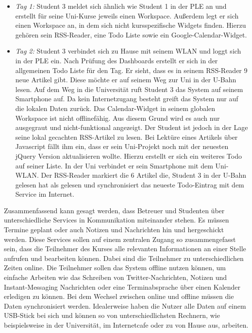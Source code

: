 \begin{itemize}
 \item \emph{Tag 1:} Student 3 meldet sich ähnlich wie Student 1 in der PLE an und erstellt für seine Uni-Kurse jeweils einen Workspace. Außerdem legt er sich einen Workspace an, in dem sich nicht kursspezifische Widgets finden. Hierzu gehören sein RSS-Reader, eine Todo Liste sowie ein Google-Calendar-Widget.
 \item \emph{Tag 2:} Student 3 verbindet sich zu Hause mit seinem WLAN und loggt sich in der PLE ein. Nach Prüfung des Dashboards erstellt er sich in der allgemeinen Todo Liste für den Tag. Er sieht, dass es in seinem RSS-Reader 9 neue Artikel gibt. Diese möchte er auf seinem Weg zur Uni in der U-Bahn lesen. Auf dem Weg in die Universität ruft Student 3 das System auf seinem Smartphone auf. Da kein Internetzugang besteht greift das System nur auf die lokalen Daten zurück. Das Calendar-Widget in seinem globalen Workspace ist nicht offlinefähig. Aus diesem Grund wird es auch nur ausgegraut und nicht-funktional angezeigt. Der Student ist jedoch in der Lage seine lokal gecachten RSS-Artikel zu lesen. Bei Lektüre eines Artikels über Javascript fällt ihm ein, dass er sein Uni-Projekt noch mit der neuesten jQuery Version aktualisieren wollte. Hierzu erstellt er sich ein weiteres Todo auf seiner Liste.
 In der Uni verbindet er sein Smartphone mit dem Uni-WLAN. Der RSS-Reader markiert die 6 Artikel die, Student 3 in der U-Bahn gelesen hat als gelesen und synchronisiert das neueste Todo-Eintrag mit dem Service im Internet.  
\end{itemize}

Zusammenfassend kann gesagt werden, dass Betreuer und Studenten über unterschiedliche Services in Kommunikation miteinander stehen. Es müssen Termine geplant oder auch Notizen und Nachrichten hin und hergeschickt werden. Diese Services sollen auf einem zentralen Zugang so zusammengefasst sein, dass die Teilnehmer des Kurses alle relevanten Informationen an einer Stelle aufrufen und bearbeiten können. Dabei sind die Teilnehmer zu unterschiedlichen Zeiten online. Die Teilnehmer sollen das System offline nutzen können, um einfache Arbeiten wie das Schreiben von Twitter-Nachrichten, Notizen und Instant-Messaging Nachrichten oder eine Terminabsprache über einen Kalender erledigen zu können. Bei dem Wechsel zwischen online und offline müssen die Daten synchronisiert werden. Idealerweise haben die Nutzer alle Daten auf einem USB-Stick bei sich und können so von unterschiedlichsten Rechnern, wie beispielsweise in der Universität, im Internetcafe oder zu von Hause aus, arbeiten.

